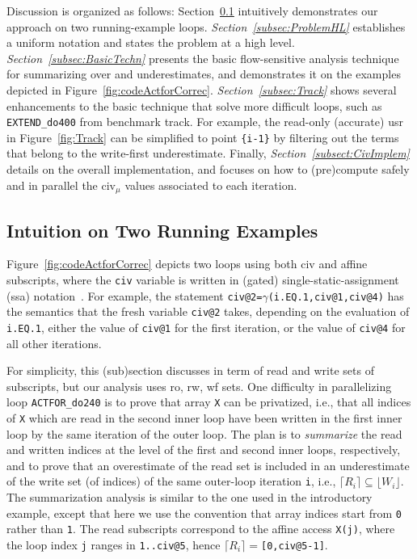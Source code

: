 \documentclass{sig-alternate}
\begin{document}
Discussion is organized as follows:
Section~\ref{Intro:RelAppLim} intuitively demonstrates our approach 
on two running-example loops. %
%
{\em Section~\ref{subsec:ProblemHL}} establishes a uniform notation and
states the problem at a high level.
%
{\em Section~\ref{subsec:BasicTechn}} presents the basic flow-sensitive 
analysis technique for summarizing over and underestimates, and 
demonstrates it on the examples depicted in 
Figure~\ref{fig:codeActforCorrec}.
%
{\em Section~\ref{subsec:Track}} shows several enhancements
to the basic technique that solve %
more difficult loops, such as {\tt EXTEND\_do400} from benchmark {\sc track}.
%
For example, the read-only (accurate) {\sc usr} in Figure~\ref{fig:Track}
can be simplified to point {\tt \{i-1\}} by filtering out the terms
that belong to the write-first underestimate.
%
Finally, {\em Section~\ref{subsect:CivImplem}} details on the overall 
implementation, and focuses on how to (pre)compute safely and in parallel 
the {\sc civ}$_\mu$ values associated to each iteration.


\subsection{Intuition on Two Running Examples}
\label{Intro:RelAppLim}

Figure~\ref{fig:codeActforCorrec} depicts two loops
using both {\sc civ} and affine subscripts, where the {\tt civ} variable 
is written in (gated) single-static-assignment ({\sc ssa}) notation~\cite{GatedSSA}.
%
For example, the statement {\tt civ@2=$\gamma$(i.EQ.1,civ@1,civ@4)}
has the semantics that the fresh variable {\tt civ@2} takes, depending 
on the evaluation of {\tt i.EQ.1}, either the value 
of {\tt civ@1} for the first iteration, or the value of 
{\tt civ@4} for all other iterations.

For simplicity, this (sub)section discusses in term of read and write sets 
of subscripts, but our analysis uses {\sc ro}, {\sc rw}, {\sc wf} sets.
%
One difficulty in parallelizing loop {\tt ACTFOR\_do240} is to
prove that array {\tt X} can be privatized, i.e., that all
indices of {\tt X} which are read in the second inner loop have been 
written in the first inner loop by the same iteration of the outer loop.
The plan is to {\em summarize} the read and written indices at the level of
the first and second inner loops, respectively, and to prove that an
overestimate of the read set  is included in an underestimate 
of the write set (of indices) of the same outer-loop iteration {\tt i},
i.e., $\lceil R_i\rceil \subseteq \lfloor W_i\rfloor$.
%
The summarization analysis is similar to the one used in the introductory 
example, except that here we use the convention %
that array indices start from {\tt 0} rather than {\tt 1}.
The read subscripts correspond to the affine access {\tt X(j)}, where
the loop index {\tt j} ranges in {\tt 1..civ@5},
hence $\lceil R_i\rceil = ${\tt[0,civ@5-1]}.
\end{document}
